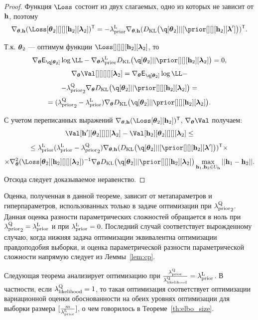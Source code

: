 \begin{proof}
Функция $\Loss$ состоит из двух слагаемых, одно из которых не зависит от $\mathbf{h}$, поэтому
\[
    \nabla_{\teta, \h} (\Loss[\teta_2][][][\h_2][\lam_2])^\mathsf{T}  = -\lamCL \nabla_{\teta, \h} (\KL{\q[\teta_2]}{[\prior[][][\h_2][\lam']})^\mathsf{T}.
\]

Т.к. $\boldsymbol{\theta}_2$ --- оптимум функции $\Loss[][][][\h_2][\lam_2]$, то 
$$ 
\nabla_{\teta} \E_{\q[\teta_2]} \log \LL - \nabla_{\teta} \lamCL \KL{\q[\teta_2]}{\prior[][][\h_2][\lam_2]} = 0,
$$
$$ 
\nabla_{\teta} \Val[][][][][\lam_2] =\nabla_{\teta} \E_{\q[\teta_2]} \log \LL -
$$
\[
- {\lamCQ}_2  \nabla_{\teta} \KL{\q[\teta_2]}{\prior[][][\h_2][\lam_2]} = 
\]
$$
   = ({\lamCQ}_2 - \lamCL)\nabla_{\teta} \KL{\q[\teta_2]}{\prior[][][\h_2][\lam_2]}.
$$

С учетом переписанных выражений $\nabla_{\teta, \h} (\Loss[\teta_2][\h_2])^\mathsf{T}$, $\nabla_{\teta} \Val$ получаем:
\[
     \Val[\h'][\teta_2][][][\lam_2] -  \Val[\h_2][\teta_2][][][\lam_2] \leq 
\]
\[
   \leq \lamCL (\lamCL - {\lamCQ}_2) \nabla_{\teta, \h} (\KL{\q[\teta_2]}{[\prior[][][\h_2][\lam']})^\mathsf{T} \times 
\]
\[
\times  \nabla_{\teta}^2(\Loss[\teta_2][\h_2][][][\lam_2])^\mathsf{-1} \nabla_{\teta} \KL{\q[\teta_2]}{\prior[][][\h_2][\lam_2]} \max_{\h_1, \h_2 \in \Uh} ||\h_1 - \h_2||.
\]
Отсюда следует доказываемое неравенство.
\end{proof}
Оценка, полученная в данной теореме, зависит от метапараметров и гиперпараметров, использованных только в задаче оптимизации при ${\lambda_\text{prior}^\text{Q}}_2$. Данная оценка разности параметрических сложностей обращается в ноль при ${\lambda_\text{prior}^\text{Q}}_2 = \lambda_\text{prior}^\text{L}$ и при $\lambda_\text{prior}^\text{L} = 0$. Последний случай соответствует вырожденному случаю, когда нижняя задача оптимизации эквивалентна оптимизации правдоподобия выборки, и оценка параметрической разности параметрической сложности напрямую следует из Леммы~\ref{lem:cp}.

Следующая теорема анализирует оптимизацию при  $\frac{\lambda_\text{prior}^\text{Q}}{\lambda_\text{likelihood}^\text{Q}} = \lambda_\text{prior}^\text{L}$. В частности, если $\lambda_\text{likelihood}^\text{Q} = 1$, то такая оптимизация соответствует оптимизации вариационной оценки обоснованности на обеих уровнях оптимизации для выборки размера $[\frac{m}{\lambda_\text{prior}^\text{L}}]$, о чем говорилось в Теореме~\ref{th:elbo_size}.

